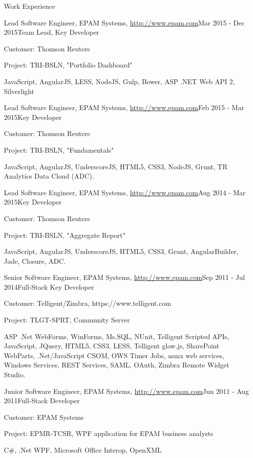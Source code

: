 \documentclass{resume}
\begin{document}
\begin{rSection}{Work Experience}
\begin{rSubsection}{Lead Software Engineer, EPAM Systems, \url{http://www.epam.com}}{Mar 2015 - Dec 2015}{Team Lead, Key Developer}{}
\item Customer: Thomson Reuters
\item Project: TRI-BSLN, "Portfolio Dashboard"
\item JavaScript, AngularJS, LESS, NodeJS, Gulp, Bower, ASP .NET Web API 2, Silverlight
\end{rSubsection}


\begin{rSubsection}{Lead Software Engineer, EPAM Systems, \url{http://www.epam.com}}{Feb 2015 - Mar 2015}{Key Developer}{}
\item Customer: Thomson Reuters
\item Project: TRI-BSLN, "Fundamentals"
\item JavaScript, AngularJS, UnderscoreJS, HTML5, CSS3, NodeJS, Grunt, TR Analytics Data Cloud (ADC).
\end{rSubsection}


\begin{rSubsection}{Lead Software Engineer, EPAM Systems, \url{http://www.epam.com}}{Aug 2014 - Mar 2015}{Key Developer}{}
\item Customer: Thomson Reuters
\item Project: TRI-BSLN, "Aggregate Report"
\item JavaScript, AngularJS, UnderscoreJS, HTML5, CSS3, Grunt, AngularBuilder, Jade, Closure, ADC.
\end{rSubsection}


\begin{rSubsection}{Senior Software Engineer, EPAM Systems, \url{http://www.epam.com}}{Sep 2011 - Jul 2014}{Full-Stack Key Developer}{}
\item Customer: Telligent/Zimbra, https://www.telligent.com
\item Project: TLGT-SPRT, Community Server
\item ASP .Net WebForms, WinForms, Ms.SQL, NUnit, Telligent Scripted APIs, JavaScript, JQuery, HTML5,
CSS3, LESS, Telligent glow.js, SharePoint WebParts, .Net/JavaScript CSOM, OWS Timer Jobs, asmx web
services, Windows Services, REST Services, SAML, OAuth, Zimbra Remote Widget Studio.
\end{rSubsection}


\begin{rSubsection}{Junior Software Engineer, EPAM Systems, \url{http://www.epam.com}}{Jun 2011 - Aug 2011}{Full-Stack Developer}{}
\item Customer: EPAM Systems
\item Project: EPMR-TCSR, WPF application for EPAM business analysts
\item C\#, .Net WPF, Microsoft Office Interop, OpenXML 
\end{rSubsection}

\end{rSection}
\end{document}
